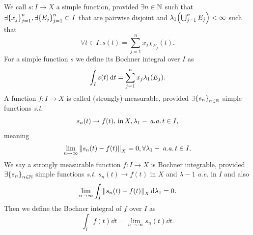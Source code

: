 \documentclass{article}
\begin{document}
\begin{definition}
	We call $s: I \to X$ a simple function, provided $\exists n \in {\mathbb N}$ such that $\exists \qty{x_j}_{j=1}^n, \exists \qty{E_j}_{j=1}^n \subset I$ that are pairwise disjoint and $\lambda_1\qty(\bigcup_{j=1}^n E_j) < \infty$ such that
	\[
		\forall t \in I: s(t) = \sum_{j=1}^n x_j \chi_{E_j}(t).
	\]
	For a simple function $s$ we define its Bochner integral over $I$ as
	\[
		\int_I s(t)\dd{t} = \sum_{j=1}^n x_j \lambda_1\qty(E_j).
	\]
	A function $f: I \to X$ is called (strongly) measurable, provided $\exists \qty{s_n}_{n \in {\mathbb N}}$ simple functions \textit{s.t.}
	\[
		s_n(t) \to f(t), \, \text{in} \, X,  \lambda_1-\, \text{\textit{a.a.}} \, t \in I,
	\]
	meaning
	\[
		\lim_{n \to \infty}\norm{s_n(t) - f(t)}_{X} = 0, \forall \lambda_1-\, \text{\textit{a.a.}} \,t \in I.
	\]
	We say a strongly measurable function $f: I \to X$ is Bochner integrable, provided $\exists \qty{s_n}_{n \in {\mathbb N}}$ simple functions \textit{s.t.} $s_n(t) \to f(t)$ in $X$ and $\lambda-1$ \textit{a.e.} in $I$ and also
	\[
		\lim_{n \to \infty} \int_I \norm{s_n(t) - f(t)}_X \dd{\lambda}_1 = 0.
	\]
	Then we define the Bochner integral of $f$ over $I$ as
	\[
		\int_I f(t) \dd{t} = \lim_{n \to \infty} s_n(t) \dd{t}.
	\]
\end{definition}
\end{document}
